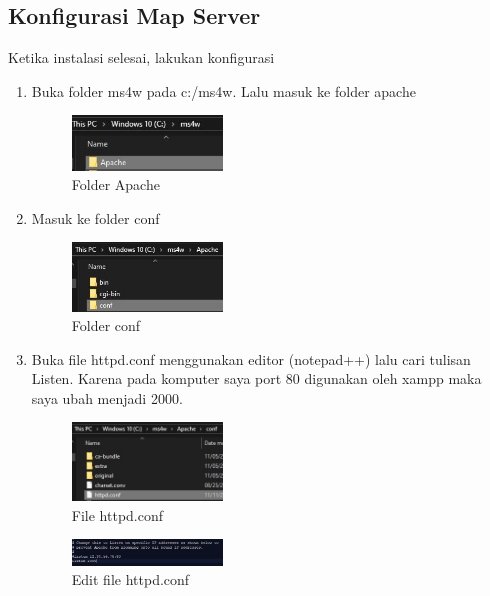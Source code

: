 \subsection{Konfigurasi Map Server}
Ketika instalasi selesai, lakukan konfigurasi
\begin{enumerate}
  \item Buka folder ms4w pada c:/ms4w. Lalu masuk ke folder apache
  \hfill\break
    \begin{figure}[H]
		\includegraphics[width=4cm]{figures/tugas4/1174066/2.jpg}
		\centering
		\caption{Folder Apache}
    \end{figure}


  \item Masuk ke folder conf
  \hfill\break
    \begin{figure}[H]
		\includegraphics[width=4cm]{figures/tugas4/1174066/3.jpg}
		\centering
		\caption{Folder conf}
    \end{figure}

  \item Buka file httpd.conf menggunakan editor (notepad++) lalu cari tulisan Listen. Karena pada komputer saya port 80 digunakan oleh xampp maka saya ubah menjadi 2000.
  \hfill\break
    \begin{figure}[H]
		\includegraphics[width=4cm]{figures/tugas4/1174066/4.jpg}
		\centering
		\caption{File httpd.conf}
    \end{figure}

  \hfill\break
    \begin{figure}[H]
		\includegraphics[width=4cm]{figures/tugas4/1174066/5.jpg}
		\centering
		\caption{Edit file httpd.conf}
    \end{figure}


\end{enumerate}
